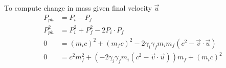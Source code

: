 \documentclass[12pt, letterpaper]{article}
\begin{document}
To compute change in mass given final velocity $\overrightarrow{u}$
\begin{align*}
  P_{ph} &= P_i - P_f \\
  P_{ph}^2 &= P_i^2 + P_f^2 - 2 P_i \cdot P_f \\
  0 &= (m_i c)^2 + (m_f c)^2 - 2 \gamma_i \gamma_f m_i m_f ( c^2 - \overrightarrow{v} \cdot \overrightarrow{u}) \\
  0 &= c^2 m_f^2 + (- 2 \gamma_i \gamma_f m_i ( c^2 - \overrightarrow{v} \cdot \overrightarrow{u})) m_f + (m_i c)^2
\end{align*}
\end{document}
